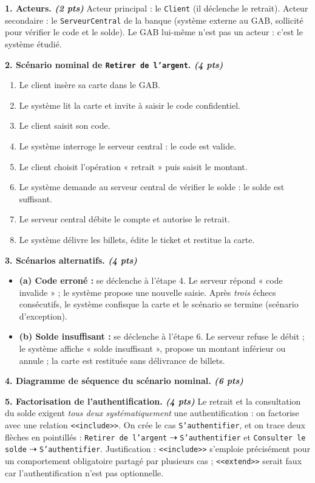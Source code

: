 \documentclass[11pt]{article}
\begin{document}
\begin{corrige}
\textbf{1. Acteurs. \emph{(2 pts)}} Acteur principal : le \texttt{Client} (il déclenche le retrait). Acteur secondaire : le \texttt{ServeurCentral} de la banque (système externe au GAB, sollicité pour vérifier le code et le solde). Le GAB lui-même n'est pas un acteur : c'est le système étudié.

\textbf{2. Scénario nominal de \texttt{Retirer de l'argent}. \emph{(4 pts)}}
\begin{enumerate}
\item Le client insère sa carte dans le GAB.
\item Le système lit la carte et invite à saisir le code confidentiel.
\item Le client saisit son code.
\item Le système interroge le serveur central : le code est valide.
\item Le client choisit l'opération « retrait » puis saisit le montant.
\item Le système demande au serveur central de vérifier le solde : le solde est suffisant.
\item Le serveur central débite le compte et autorise le retrait.
\item Le système délivre les billets, édite le ticket et restitue la carte.
\end{enumerate}

\textbf{3. Scénarios alternatifs. \emph{(4 pts)}}
\begin{itemize}
\item \textbf{(a) Code erroné :} se déclenche à l'étape 4. Le serveur répond « code invalide » ; le système propose une nouvelle saisie. Après \emph{trois} échecs consécutifs, le système confisque la carte et le scénario se termine (scénario d'exception).
\item \textbf{(b) Solde insuffisant :} se déclenche à l'étape 6. Le serveur refuse le débit ; le système affiche « solde insuffisant », propose un montant inférieur ou annule ; la carte est restituée sans délivrance de billets.
\end{itemize}

\textbf{4. Diagramme de séquence du scénario nominal. \emph{(6 pts)}}

\textbf{5. Factorisation de l'authentification. \emph{(4 pts)}} Le retrait et la consultation du solde exigent \emph{tous deux systématiquement} une authentification : on factorise avec une relation \texttt{<<include>>}. On crée le cas \texttt{S'authentifier}, et on trace deux flèches en pointillés : \texttt{Retirer de l'argent} $\dashrightarrow$ \texttt{S'authentifier} et \texttt{Consulter le solde} $\dashrightarrow$ \texttt{S'authentifier}. Justification : \texttt{<<include>>} s'emploie précisément pour un comportement obligatoire partagé par plusieurs cas ; \texttt{<<extend>>} serait faux car l'authentification n'est pas optionnelle.


\end{corrige}
\end{document}
